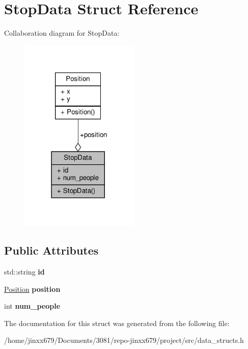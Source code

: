 \hypertarget{structStopData}{}\section{Stop\+Data Struct Reference}
\label{structStopData}


Collaboration diagram for Stop\+Data\+:\nopagebreak
\begin{figure}[H]
\begin{center}
\leavevmode
\includegraphics[width=162pt]{structStopData__coll__graph}
\end{center}
\end{figure}
\subsection*{Public Attributes}
\begin{DoxyCompactItemize}
\item 
\mbox{\label{structStopData_abf63e623637d887c203c2a02b0855bb4}} 
std\+::string {\bfseries id}
\item 
\mbox{\label{structStopData_ae2e45d96bcd5b5f262796a6200a14fda}} 
\hyperlink{structPosition}{Position} {\bfseries position}
\item 
\mbox{\label{structStopData_ac8346b0259972f304061a205d3f75f80}} 
int {\bfseries num\+\_\+people}
\end{DoxyCompactItemize}


The documentation for this struct was generated from the following file\+:\begin{DoxyCompactItemize}
\item 
/home/jinxx679/\+Documents/3081/repo-\/jinxx679/project/src/data\+\_\+structs.\+h\end{DoxyCompactItemize}
